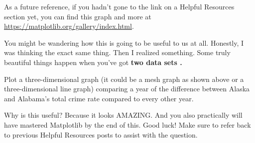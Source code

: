 \documentclass{article}
\begin{document}
    As a future reference, if you hadn't gone to the link on a Helpful Resources section yet, you can find this graph and more at \url{https://matplotlib.org/gallery/index.html}.

    You might be wandering how this is going to be useful to us at all. Honestly, I was thinking the exact same thing. Then I realized something. Some truly beautiful things happen when you've got \bfseries two data sets \mdseries.

    Plot a three-dimensional graph (it could be a mesh graph as shown above or a three-dimensional line graph) comparing a year of the difference between Alaska and Alabama's total crime rate compared to every other year.

    Why is this useful? Because it looks AMAZING. And you also practically will have mastered Matplotlib by the end of this. Good luck! Make sure to refer back to previous Helpful Resources posts to assist with the question.
\end{document}
